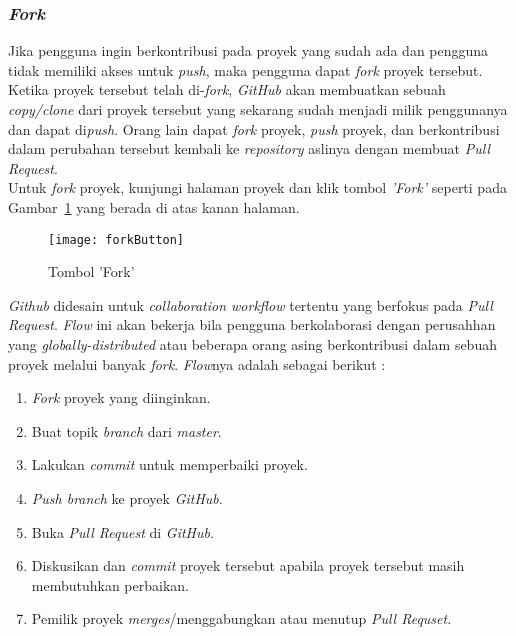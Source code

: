 \subsubsection{\textit{Fork}}
Jika pengguna ingin berkontribusi pada proyek yang sudah ada dan pengguna tidak memiliki akses untuk \textit{push}, maka pengguna dapat \textit{fork} proyek tersebut. Ketika proyek tersebut telah di-\textit{fork}, \textit{GitHub} akan membuatkan sebuah \textit{copy/clone} dari proyek tersebut yang sekarang sudah menjadi milik penggunanya dan dapat di\textit{push}. Orang lain dapat \textit{fork} proyek, \textit{push} proyek, dan berkontribusi dalam perubahan tersebut kembali ke \textit{repository} aslinya dengan membuat \textit{Pull Request}.\\

Untuk \textit{fork} proyek, kunjungi halaman proyek dan klik tombol \textit{'Fork'} seperti pada Gambar~\ref{fig:forkButton} yang berada di atas kanan halaman. 

\begin{figure}[H]
	\centering  
	\texttt{[image: forkButton]}  
	\caption[Tombol 'Fork']{Tombol 'Fork'}
	\label{fig:forkButton} 
\end{figure}

\textit{Github} didesain untuk \textit{collaboration workflow} tertentu yang berfokus pada \textit{Pull Request}. \textit{Flow} ini akan bekerja bila pengguna berkolaborasi dengan perusahhan yang \textit{globally-distributed} atau beberapa orang asing berkontribusi dalam sebuah proyek melalui banyak \textit{fork}. \textit{Flow}nya adalah sebagai berikut :

\begin{enumerate}
	\item \textit{Fork} proyek yang diinginkan.
	\item Buat topik \textit{branch} dari \textit{master}.
	\item Lakukan \textit{commit} untuk memperbaiki proyek.
	\item \textit{Push branch} ke proyek \textit{GitHub}.
	\item Buka \textit{Pull Request} di \textit{GitHub}.
	\item Diskusikan dan \textit{commit} proyek tersebut apabila proyek tersebut masih membutuhkan perbaikan.
	\item Pemilik proyek \textit{merges}/menggabungkan atau menutup \textit{Pull Requset}.
\end{enumerate}

